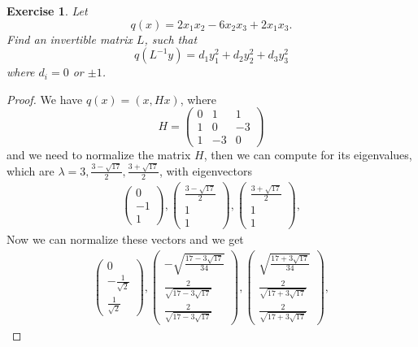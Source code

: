 \documentclass[11pt]{book}
\newtheorem{exercise}{Exercise}[section]
\theoremstyle{definition}
\numberwithin{equation}{chapter}
\begin{document}
\begin{exercise}
Let%
$$
q\left(x\right) = 2x_{1}x_{2}-6x_{2}x_{3}+2x_{1}x_{3}.
$$
Find an invertible matrix $L$, such that%
$$
q\left(  L^{-1}y\right)  =d_{1}y_{1}^{2}+d_{2}y_{2}^{2}+d_{3}y_{3}^{2}%
$$
where $d_{i}=0$ or $\pm1$.
\end{exercise}
\begin{proof}
We have $q(x) = (x,Hx)$, where 
$$
H = \left(
\begin{matrix}
0 & 1 & 1\\
1 & 0 & -3\\
1 & -3 & 0
\end{matrix}
\right)
$$
and we need to normalize the matrix $H$, then we can compute for its eigenvalues, which are $\lambda = 3, \frac{3-\sqrt{17}}{2}, \frac{3+\sqrt{17}}{2}$, with eigenvectors 
\begin{align*}
    \left(\begin{matrix} 0 \\ - 1\\ 1 
    \end{matrix}\right), 
    \left(\begin{matrix} \frac{3-\sqrt{17}}{2} \\ 1\\ 1 
    \end{matrix}\right), 
    \left(\begin{matrix} \frac{3+\sqrt{17}}{2} \\ 1\\ 1 
    \end{matrix}\right), 
\end{align*}
Now we can normalize these vectors and we get 
\begin{align*}
    \left(\begin{matrix} 0 \\ - \frac{1}{\sqrt{2}}\\ \frac{1}{\sqrt{2}} 
    \end{matrix}\right), 
    \left(\begin{matrix} -\sqrt{\frac{17-3\sqrt{17}}{34}} \\ \frac{2}{\sqrt{17-3\sqrt{17}}}\\ \frac{2}{\sqrt{17-3\sqrt{17}}} 
    \end{matrix}\right), 
    \left(\begin{matrix} \sqrt{\frac{17+3\sqrt{17}}{34}} \\ \frac{2}{\sqrt{17+3\sqrt{17}}} \\ \frac{2}{\sqrt{17+3\sqrt{17}}} 
    \end{matrix}\right), 

\end{align*}
\end{proof}
\end{document}
